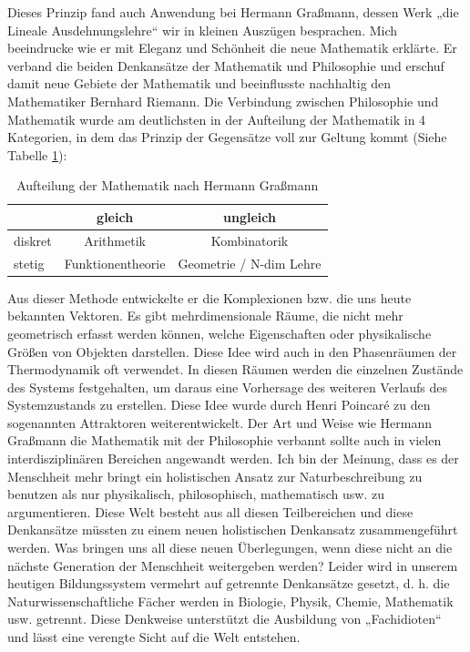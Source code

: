 \documentclass[DIN,
	fontsize=12pt,
a4paper]{scrartcl}
\begin{document}
Dieses Prinzip fand auch Anwendung bei Hermann Graßmann, dessen Werk „die Lineale Ausdehnungslehre“ wir in kleinen Auszügen besprachen.
Mich beeindrucke wie er mit Eleganz und Schönheit die neue Mathematik erklärte.
Er verband die beiden Denkansätze der Mathematik und Philosophie und erschuf damit neue Gebiete der Mathematik und beeinflusste nachhaltig den Mathematiker Bernhard Riemann.
Die Verbindung zwischen Philosophie und Mathematik wurde am deutlichsten in der Aufteilung der Mathematik in 4 Kategorien, in dem das Prinzip der Gegensätze voll zur Geltung kommt (Siehe Tabelle \ref{Tab:Grass}):

\begin{table}[htp!]
	\begin{center}
	\caption{Aufteilung der Mathematik nach Hermann Graßmann}
	\begin{tabular}{l|c|c}
	& gleich & ungleich \\\hline
	diskret & Arithmetik & Kombinatorik \\ \hline
	stetig & Funktionentheorie & Geometrie / N-dim Lehre
	\label{Tab:Grass}
	\end{tabular}
	\end{center}
\end{table}

Aus dieser Methode entwickelte er die Komplexionen bzw. die uns heute bekannten Vektoren.
Es gibt mehrdimensionale Räume, die nicht mehr geometrisch erfasst werden können, welche Eigenschaften oder physikalische Größen von Objekten darstellen.
Diese Idee wird auch in den Phasenräumen der Thermodynamik oft verwendet.
In diesen Räumen werden die einzelnen Zustände des Systems festgehalten, um daraus eine Vorhersage des weiteren Verlaufs des Systemzustands zu erstellen.
Diese Idee wurde durch Henri Poincaré zu den sogenannten Attraktoren weiterentwickelt.
Der Art und Weise wie Hermann Graßmann die Mathematik mit der Philosophie verbannt sollte auch in vielen interdisziplinären Bereichen angewandt werden.
Ich bin der Meinung, dass es der Menschheit mehr bringt ein holistischen Ansatz zur Naturbeschreibung zu benutzen als nur physikalisch, philosophisch, mathematisch usw. zu argumentieren.
Diese Welt besteht aus all diesen Teilbereichen und diese Denkansätze müssten zu einem neuen holistischen Denkansatz zusammengeführt werden.
Was bringen uns all diese neuen Überlegungen, wenn diese nicht an die nächste Generation der Menschheit weitergeben werden?
Leider wird in unserem heutigen Bildungssystem vermehrt auf getrennte Denkansätze gesetzt, d. h. die Naturwissenschaftliche Fächer werden in Biologie, Physik, Chemie, Mathematik usw. getrennt.
Diese Denkweise unterstützt die Ausbildung von „Fachidioten“ und lässt eine verengte Sicht auf die Welt entstehen.
\end{document}
